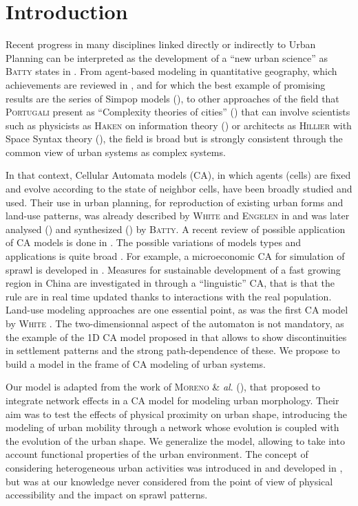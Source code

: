 \documentclass[a4paper,twocolumn,twoside,10pt]{article}
\newcommand{\noun}[1]{\textsc{#1}}
\begin{document}
\section{Introduction}

Recent progress in many disciplines linked directly or indirectly
to Urban Planning can be interpreted as the development of a ``new
urban science'' as \noun{Batty} states in \cite{batty2013new}. From
agent-based modeling in quantitative geography, which achievements
are reviewed in \cite{heppenstall2012agent}, and for which the best
example of promising results are the series of Simpop models (\cite{pumain2012multi}),
to other approaches of the field that \noun{Portugali} present as
``Complexity theories of cities'' (\cite{portugali2012book}) that
can involve scientists such as physicists as \noun{Haken} on information
theory (\cite{haken2003face}) or architects as \noun{Hillier} with
Space Syntax theory (\cite{hillier1976space}), the field is broad
but is strongly consistent through the common view of urban systems
as complex systems.

In that context, Cellular Automata models (CA), in which agents (cells)
are fixed and evolve according to the state of neighbor cells, have
been broadly studied and used. Their use in urban planning, for reproduction
of existing urban forms and land-use patterns, was already described
by \noun{White} and \noun{Engelen} in \cite{white1993cellular} and
was later analysed (\cite{batty1997cellular,batty1997possible}) and
synthesized (\cite{Bat07}) by \noun{Batty. }A recent review of possible
application of CA models is done in \cite{iltanen2012cellular}. The
possible variations of models types and applications is quite broad
. For example, a microeconomic CA for simulation of sprawl is developed
in \cite{DBM11}. Measures for sustainable development of a fast growing
region in China are investigated in \cite{Wu96alinguistic} through
a ``linguistic'' CA, that is that the rule are in real time updated
thanks to interactions with the real population. Land-use modeling
approaches are one essential point, as was the first CA model by \noun{White}
. The two-dimensionnal aspect of the automaton is not mandatory,
as the example of the 1D CA model proposed in \cite{peeters2009space}
that allows to show discontinuities in settlement patterns and the
strong path-dependence of these. We propose to build a model in the
frame of CA modeling of urban systems.

Our model is adapted from the work of \noun{Moreno} \& \textit{al}.
(\cite{MBB09,moreno2007conception}), that proposed to integrate network
effects in a CA model for modeling urban morphology. Their aim was
to test the effects of physical proximity on urban shape, introducing
the modeling of urban mobility through a network whose evolution is
coupled with the evolution of the urban shape. We generalize the model,
allowing to take into account functional properties of the urban environment.
The concept of considering heterogeneous urban activities was introduced
in \cite{white2006modeling} and developed in \cite{van2012activity},
but was at our knowledge never considered from the point of view of
physical accessibility and the impact on sprawl patterns.
\end{document}
